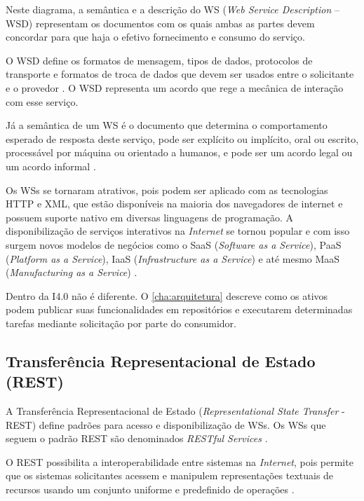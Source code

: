 Neste diagrama, a semântica e a descrição do WS (\textit{Web Service Description} -- WSD) representam os documentos com os quais ambas as partes devem concordar para que haja o efetivo fornecimento e consumo do serviço.

O WSD define os formatos de mensagem, tipos de dados, protocolos de transporte e formatos de troca de dados que devem ser usados entre o solicitante e o provedor \cite{booth2004webservice}. O WSD representa um acordo que rege a mecânica de interação com esse serviço.

Já a semântica de um WS é o documento que determina o comportamento esperado de resposta deste serviço, pode ser explícito ou implícito, oral ou escrito, processável por máquina ou orientado a humanos, e pode ser um acordo legal ou um acordo informal \cite{booth2004webservice}.

Os WSs se tornaram atrativos, pois podem ser aplicado com as tecnologias HTTP e XML, que estão disponíveis na maioria dos navegadores de internet e possuem suporte nativo em diversas linguagens de programação. A disponibilização de serviços interativos na \textit{Internet} se tornou popular e com isso surgem novos modelos de negócios como o SaaS (\textit{Software as a Service}), PaaS (\textit{Platform as a Service}), IaaS (\textit{Infrastructure as a Service}) e até mesmo MaaS (\textit{Manufacturing as a Service}) \cite{annunziata2019maas, nichols2020maas, siepen2019maas}.

Dentro da I4.0 não é diferente. O \autoref{cha:arquitetura} descreve como os ativos podem publicar suas funcionalidades em repositórios e executarem determinadas tarefas mediante solicitação por parte do consumidor.

\subsection{Transferência Representacional de Estado (REST)}
\label{sub:rest}

A Transferência Representacional de Estado (\textit{Representational State Transfer} - REST) define padrões para acesso e disponibilização de WSs. Os WSs que seguem o padrão REST são denominados \textit{RESTful Services} \cite{fielding2000rest}.

O REST possibilita a interoperabilidade entre sistemas na \textit{Internet}, pois permite que os sistemas solicitantes acessem e manipulem representações textuais de recursos usando um conjunto uniforme e predefinido de operações \cite{booth2004webservice}.

